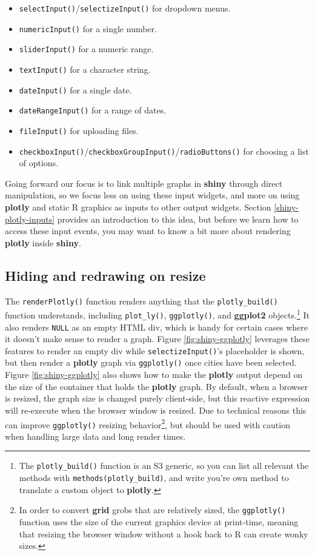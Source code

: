 \documentclass[
  12pt,
]{krantz}
\providecommand{\tightlist}{%
  \setlength{\itemsep}{0pt}\setlength{\parskip}{0pt}}
\begin{document}
\begin{itemize}
\tightlist
\item
  \texttt{selectInput()}/\texttt{selectizeInput()} for dropdown menus.
\item
  \texttt{numericInput()} for a single number.
\item
  \texttt{sliderInput()} for a numeric range.
\item
  \texttt{textInput()} for a character string.
\item
  \texttt{dateInput()} for a single date.
\item
  \texttt{dateRangeInput()} for a range of dates.
\item
  \texttt{fileInput()} for uploading files.
\item
  \texttt{checkboxInput()}/\texttt{checkboxGroupInput()}/\texttt{radioButtons()} for choosing a list of options.
\end{itemize}

Going forward our focus is to link multiple graphs in \textbf{shiny} through direct manipulation, so we focus less on using these input widgets, and more on using \textbf{plotly} and static R graphics as inputs to other output widgets. Section \ref{shiny-plotly-inputs} provides an introduction to this idea, but before we learn how to access these input events, you may want to know a bit more about rendering \textbf{plotly} inside \textbf{shiny}.

\hypertarget{hiding-and-redrawing-on-resize}{%
\subsection{Hiding and redrawing on resize}\label{hiding-and-redrawing-on-resize}}

The \texttt{renderPlotly()} function renders anything that the \texttt{plotly\_build()} function understands, including \texttt{plot\_ly()}, \texttt{ggplotly()}, and \textbf{ggplot2} objects.\footnote{The \texttt{plotly\_build()} function is an S3 generic, so you can list all relevant the methods with \texttt{methods(plotly\_build)}, and write you're own method to translate a custom object to \textbf{plotly}.} It also renders \texttt{NULL} as an empty HTML div, which is handy for certain cases where it doesn't make sense to render a graph. Figure \ref{fig:shiny-ggplotly} leverages these features to render an empty div while \texttt{selectizeInput()}'s placeholder is shown, but then render a \textbf{plotly} graph via \texttt{ggplotly()} once cities have been selected. Figure \ref{fig:shiny-ggplotly} also shows how to make the \textbf{plotly} output depend on the size of the container that holds the \textbf{plotly} graph. By default, when a browser is resized, the graph size is changed purely client-side, but this reactive expression will re-execute when the browser window is resized. Due to technical reasons this can improve \texttt{ggplotly()} resizing behavior\footnote{In order to convert \textbf{grid} grobs that are relatively sized, the \texttt{ggplotly()} function uses the size of the current graphics device at print-time, meaning that resizing the browser window without a hook back to R can create wonky sizes.}, but should be used with caution when handling large data and long render times.
\end{document}
